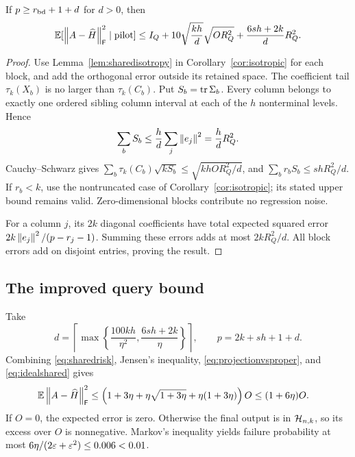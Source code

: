 \begin{proposition}\label{prop:sharedrisk}
If $p\ge r_{\rm bd}+1+d$ for $d>0$, then
\begin{equation}\label{eq:sharedrisk}
 \mathbb E[\left\lVert A-\widehat H\right\rVert_\mathsf F^2\mid\text{pilot}]
 \le I_Q+10\sqrt{\frac{kh}{d}}\sqrt{O R_Q^2}
      +\frac{6sh+2k}{d}R_Q^2.
\end{equation}
\end{proposition}
\begin{proof}
Use Lemma~\ref{lem:sharedisotropy} in
Corollary~\ref{cor:isotropic} for each block, and add the orthogonal error
outside its retained space. The coefficient tail
$\tau_k(X_b)$ is no larger than $\tau_k(C_b)$.
Put $S_b=\operatorname{tr}\Sigma_b$. Every column belongs to exactly one ordered sibling
column interval at each of the $h$ nonterminal levels. Hence
\[
 \sum_b S_b\le\frac{h}{d}\sum_j\left\lVert e_j\right\rVert^2=\frac{h}{d}R_Q^2.
\]
Cauchy--Schwarz gives
$\sum_b\tau_k(C_b)\sqrt{kS_b}\le\sqrt{khOR_Q^2/d}$, and
$\sum_b r_bS_b\le shR_Q^2/d$.
If $r_b<k$, use the nontruncated case of
Corollary~\ref{cor:isotropic}; its stated upper bound remains valid.
Zero-dimensional blocks contribute no regression noise.

For a column $j$, its $2k$ diagonal coefficients have total expected squared
error $2k\left\lVert e_j\right\rVert^2/(p-r_j-1)$. Summing these errors adds at most
$2kR_Q^2/d$. All block errors add on disjoint entries, proving the result.
\end{proof}

\subsection{The improved query bound}

Take
\begin{equation}\label{eq:sharedwidth}
 d=\left\lceil\max\left\{\frac{100kh}{\eta^2},
                    \frac{6sh+2k}{\eta}\right\}\right\rceil,
 \qquad p=2k+sh+1+d.
\end{equation}
Combining \eqref{eq:sharedrisk}, Jensen's inequality,
\eqref{eq:projectionvsproper}, and \eqref{eq:idealshared} gives
\begin{align*}
 \mathbb E\left\lVert A-\widehat H\right\rVert_\mathsf F^2
 &\le \left(1+3\eta+\eta\sqrt{1+3\eta}
                      +\eta(1+3\eta)\right)O\le(1+6\eta)O.
\end{align*}
If $O=0$, the expected error is zero. Otherwise the final output is in
$\mathcal H_{n,k}$, so its excess over $O$ is nonnegative. Markov's inequality yields
failure probability at most
$6\eta/(2\varepsilon+\varepsilon^2)\le0.006<0.01$.

